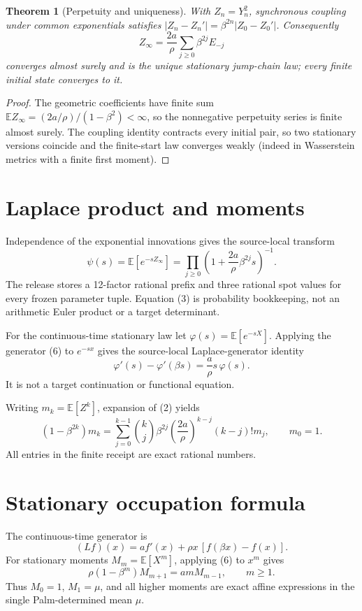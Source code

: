 \documentclass[10pt]{article}
\newtheorem{theorem}{Theorem}
\begin{document}
\begin{theorem}[Perpetuity and uniqueness]
With \(Z_n=Y_n^2\), synchronous coupling under common exponentials satisfies
\(|Z_n-Z_n'|=\beta^{2n}|Z_0-Z_0'|\).  Consequently
\[
 Z_\infty=\frac{2a}{\rho}\sum_{j\ge0}\beta^{2j}E_{-j}
\]
converges almost surely and is the unique stationary jump-chain law; every
finite initial state converges to it.
\end{theorem}
\begin{proof}
The geometric coefficients have finite sum
\(\mathbb E Z_\infty=(2a/\rho)/(1-\beta^2)<\infty\), so the nonnegative
perpetuity series is finite almost surely.  The coupling identity contracts every
initial pair, so two stationary versions coincide and the finite-start law
converges weakly (indeed in Wasserstein metrics with a finite first moment).
\end{proof}

\section{Laplace product and moments}
Independence of the exponential innovations gives the source-local transform
\begin{equation}
 \psi(s)=\mathbb E[e^{-sZ_\infty}]
 =\prod_{j\ge0}\left(1+\frac{2a}{\rho}\beta^{2j}s\right)^{-1}. \tag{3}
\end{equation}
The release stores a 12-factor rational prefix and three rational spot values
for every frozen parameter tuple.  Equation (3) is probability bookkeeping,
not an arithmetic Euler product or a target determinant.

For the continuous-time stationary law let
\(\varphi(s)=\mathbb E[e^{-sX}]\).  Applying the generator (6) to \(e^{-sx}\) gives the
source-local Laplace-generator identity
\begin{equation}
 \varphi'(s)-\varphi'(\beta s)=\frac{a}{\rho}s\,\varphi(s). \tag{4}
\end{equation}
It is not a target continuation or functional equation.

Writing \(m_k=\mathbb E[Z^k]\), expansion of (2) yields
\begin{equation}
 (1-\beta^{2k})m_k=
 \sum_{j=0}^{k-1}\binom{k}{j}\beta^{2j}
 \left(\frac{2a}{\rho}\right)^{k-j}(k-j)!m_j,\qquad m_0=1. \tag{5}
\end{equation}
All entries in the finite receipt are exact rational numbers.

\section{Stationary occupation formula}
The continuous-time generator is
\begin{equation}
 (Lf)(x)=a f'(x)+\rho x\,[f(\beta x)-f(x)]. \tag{6}
\end{equation}
For stationary moments \(M_m=\mathbb E[X^m]\), applying (6) to \(x^m\) gives
\begin{equation}
 \rho(1-\beta^m)M_{m+1}=amM_{m-1},\qquad m\ge1. \tag{7}
\end{equation}
Thus \(M_0=1\), \(M_1=\mu\), and all higher moments are exact affine expressions
in the single Palm-determined mean \(\mu\).
\end{document}
